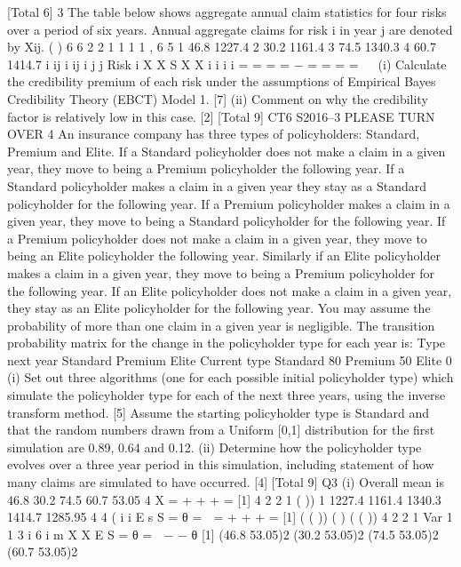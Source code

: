 [Total 6]
3 The table below shows aggregate annual claim statistics for four risks over a period of
six years. Annual aggregate claims for risk i in year j are denoted by Xij.
( ) 6 6 2 2
1 1
1 1 ,
6 5
1 46.8 1227.4
2 30.2 1161.4
3 74.5 1340.3
4 60.7 1414.7
i ij i ij i
j j
Risk i X X S X X
i
i
i
i
= =
  = = −
=
  =
  =
  =
   
(i) Calculate the credibility premium of each risk under the assumptions of
Empirical Bayes Credibility Theory (EBCT) Model 1. [7]
(ii) Comment on why the credibility factor is relatively low in this case. [2]
[Total 9]
CT6 S2016–3 PLEASE TURN OVER
4 An insurance company has three types of policyholders: Standard, Premium and Elite.
If a Standard policyholder does not make a claim in a given year, they move to being
a Premium policyholder the following year. If a Standard policyholder makes a claim
in a given year they stay as a Standard policyholder for the following year.
If a Premium policyholder makes a claim in a given year, they move to being a
Standard policyholder for the following year. If a Premium policyholder does not
make a claim in a given year, they move to being an Elite policyholder the following
year.
Similarly if an Elite policyholder makes a claim in a given year, they move to being a
Premium policyholder for the following year. If an Elite policyholder does not make
a claim in a given year, they stay as an Elite policyholder for the following year.
You may assume the probability of more than one claim in a given year is negligible.
The transition probability matrix for the change in the policyholder type for each year
is:
  Type next year
Standard Premium Elite
Current type
Standard 80%
Premium 50%
Elite 0%
(i) Set out three algorithms (one for each possible initial policyholder type) which
simulate the policyholder type for each of the next three years, using the
inverse transform method. [5]
Assume the starting policyholder type is Standard and that the random numbers drawn
from a Uniform [0,1] distribution for the first simulation are 0.89, 0.64 and 0.12.
(ii) Determine how the policyholder type evolves over a three year period in this
simulation, including statement of how many claims are simulated to have
occurred. [4]
[Total 9]
Q3 (i) Overall mean is 46.8 30.2 74.5 60.7 53.05
4
X = + + + = [1]
4
2 2
1
( )) 1 1227.4 1161.4 1340.3 1414.7 1285.95
4 4
( i
  i
  E s S
  =
    θ =  = + + + = [1]
  ( ( )) ( ) ( ( )) 4 2 2
  1
  Var 1 1
  3 i 6
  i
  m X X E S
  =
    θ =  − − θ [1]
  (46.8 53.05)2 (30.2 53.05)2 (74.5 53.05)2 (60.7 53.05)2
